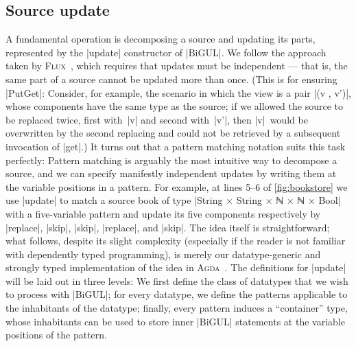 \documentclass{sigplanconf}
\newcommand{\Agda}{\textsc{Agda}}
\begin{document}
\subsection{Source update}
\label{sec:source-update}

A fundamental operation is decomposing a source and updating its parts, represented by the |update| constructor of |BiGUL|.
We follow the approach taken by \textsc{Flux}~\cite{Cheney-FLUX}, which requires that updates must be independent --- that is, the same part of a source cannot be updated more than once.
(This is for ensuring |PutGet|: Consider, for example, the scenario in which the view is a pair |(v , v')|, whose components have the same type as the source; if we allowed the source to be replaced twice, first with~|v| and second with~|v'|, then |v|~would be overwritten by the second replacing and could not be retrieved by a subsequent invocation of |get|.)
It turns out that a pattern matching notation suits this task perfectly: Pattern matching is arguably the most intuitive way to decompose a source, and we can specify manifestly independent updates by writing them at the variable positions in a pattern.
For example, at lines 5--6 of \autoref{fig:bookstore} we use |update| to match a source book of type |String × String × ℕ × ℕ × Bool| with a five-variable pattern and update its five components respectively by |replace|, |skip|, |skip|, |replace|, and |skip|.
The idea itself is straightforward; what follows, despite its slight complexity (especially if the reader is not familiar with dependently typed programming), is merely our datatype-generic and strongly typed implementation of the idea in \Agda~\cite{Gibbons-DGP,Altenkirch-GP-within-DTP}.
The definitions for |update| will be laid out in three levels:
We first define the class of datatypes that we wish to process with |BiGUL|; for every datatype, we define the patterns applicable to the inhabitants of the datatype; finally, every pattern induces a ``container'' type, whose inhabitants can be used to store inner |BiGUL| statements at the variable positions of the pattern.
\end{document}
